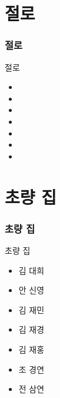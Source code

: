 \documentclass[aspectratio=1610,20pt,xcolor=pdftex,dvipsnames,table,handout]{beamer}
\begin{document}
		\section{절로}
		\begin{frame} [t,plain]
		\frametitle{절로}
			\begin{block} {절로}
			\setlength{\leftmargini}{1em}			
			\begin{itemize}
				\item 	\hrulefill
				\item 	\hrulefill
				\item 	\hrulefill
				\item 	\hrulefill
				\item 	\hrulefill
				\item 	\hrulefill
				\item 	\hrulefill
			\end{itemize}
			\end{block}			
								
		\end{frame}						


		\section{초량 집}
		\begin{frame} [t,plain]
		\frametitle{초량 집}
			\begin{block} {초량 집}
			\setlength{\leftmargini}{1em}			
			\begin{itemize}
				\item 	\hrulefill	김 대희
				\item 	\hrulefill	안 신영
				\item 	\hrulefill	김 재민
				\item 	\hrulefill	김 재경
				\item 	\hrulefill	김 재홍
				\item 	\hrulefill	조 경연
				\item 	\hrulefill	전 삼연
			\end{itemize}
			\end{block}			
								
		\end{frame}						
			

\end{document}
